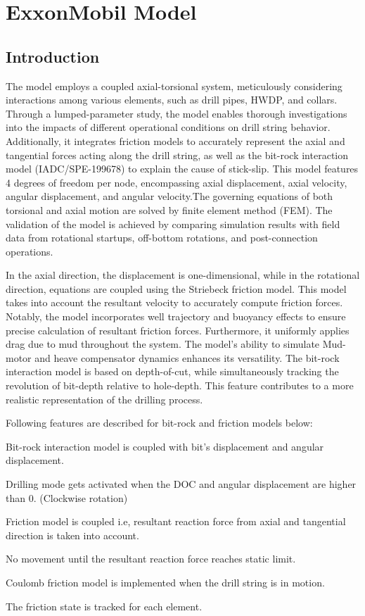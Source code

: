 \chapter{ExxonMobil Model}
\label{ch:exxonmobilmodel}

\section{Introduction}
The model employs a coupled axial-torsional system, meticulously considering interactions among various elements, such as drill pipes, HWDP, and collars. Through a lumped-parameter study, the model enables thorough investigations into the impacts of different operational conditions on drill string behavior. Additionally, it integrates friction models to accurately represent the axial and tangential forces acting along the drill string, as well as the bit-rock interaction model (IADC/SPE-199678) to explain the cause of stick-slip. This model features 4 degrees of freedom per node, encompassing axial displacement, axial velocity, angular displacement, and angular velocity.The governing equations of both torsional and axial motion are solved by finite element method (FEM). The validation of the model is achieved by comparing simulation results with field data from rotational startups, off-bottom rotations, and post-connection operations. 

In the axial direction, the displacement is one-dimensional, while in the rotational direction, equations are coupled using the Striebeck friction model. This model takes into account the resultant velocity to accurately compute friction forces. Notably, the model incorporates well trajectory and buoyancy effects to ensure precise calculation of resultant friction forces. Furthermore, it uniformly applies drag due to mud throughout the system. The model's ability to simulate Mud-motor and heave compensator dynamics enhances its versatility. The bit-rock interaction model is based on depth-of-cut, while simultaneously tracking the revolution of bit-depth relative to hole-depth. This feature contributes to a more realistic representation of the drilling process.

Following features are described for bit-rock and friction models below:
\begin{bulletedlist}
    \item Bit-rock interaction model is coupled with bit's displacement and angular displacement.
    \item Drilling mode gets activated when the DOC and angular displacement are higher than 0. (Clockwise rotation) 
    \item Friction model is coupled i.e, resultant reaction force from axial and tangential direction is taken into account.
    \item No movement until the resultant reaction force reaches static limit.
    \item Coulomb friction model is implemented when the drill string is in motion.
    \item The friction state is tracked for each element.
\end{bulletedlist}

